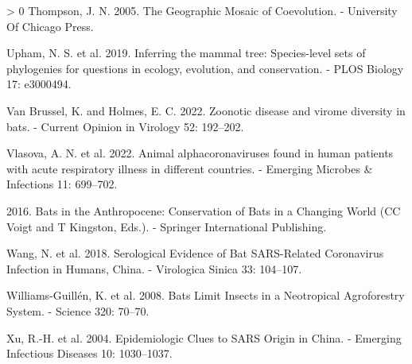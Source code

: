 \documentclass[11pt]{article}
\newlength{\cslhangindent}
\newenvironment{CSLReferences}[3] %
 {%
  \setlength{\parindent}{0pt}
  \ifodd #1 \everypar{\setlength{\hangindent}{\cslhangindent}}\ignorespaces\fi
  \ifnum #2 > 0
  \setlength{\parskip}{#2\baselineskip}
  \fi
 }%
 {}
\begin{document}
\begin{CSLReferences}{1}{0}
\leavevmode\hypertarget{ref-Thompson2005GeoMos}{}%
Thompson, J. N. 2005. The Geographic Mosaic of Coevolution. - University
Of Chicago Press.

\leavevmode\hypertarget{ref-Upham2019InfMam}{}%
Upham, N. S. et al. 2019. Inferring the mammal tree: Species-level sets
of phylogenies for questions in ecology, evolution, and conservation. -
PLOS Biology 17: e3000494.

\leavevmode\hypertarget{ref-VanBrussel2022ZooDis}{}%
Van Brussel, K. and Holmes, E. C. 2022. Zoonotic disease and virome
diversity in bats. - Current Opinion in Virology 52: 192--202.

\leavevmode\hypertarget{ref-Vlasova2022AniAlp}{}%
Vlasova, A. N. et al. 2022. Animal alphacoronaviruses found in human
patients with acute respiratory illness in different countries. -
Emerging Microbes \& Infections 11: 699--702.

\leavevmode\hypertarget{ref-Voigt2016BatAnt}{}%
2016. Bats in the Anthropocene: Conservation of Bats in a Changing World
(CC Voigt and T Kingston, Eds.). - Springer International Publishing.

\leavevmode\hypertarget{ref-Wang2018SerEvi}{}%
Wang, N. et al. 2018. Serological Evidence of Bat SARS-Related
Coronavirus Infection in Humans, China. - Virologica Sinica 33:
104--107.

\leavevmode\hypertarget{ref-Williams-Guillen2008BatLim}{}%
Williams-Guillén, K. et al. 2008. Bats Limit Insects in a Neotropical
Agroforestry System. - Science 320: 70--70.

\leavevmode\hypertarget{ref-Xu2004EpiClu}{}%
Xu, R.-H. et al. 2004. Epidemiologic Clues to SARS Origin in China. -
Emerging Infectious Diseases 10: 1030--1037.

\end{CSLReferences}
\end{document}
